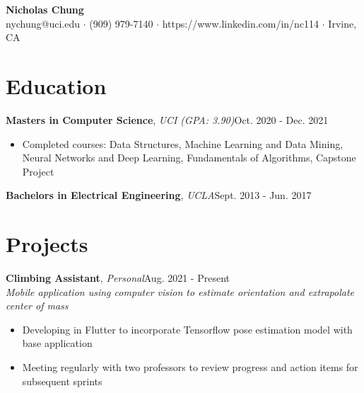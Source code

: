 \documentclass[12pt]{article}
\newcommand\firstboxx[2]{\textbf{\fontsize{12.8}{15}\selectfont #1}, \textit{#2}}
\newcommand{\itemheader}[3]{\firstboxx{#1}{#2}\hfill#3}
\begin{document}
\begin{center}
	\textbf{\LARGE Nicholas Chung} \\ \vspace{.5ex}
	nychung@uci.edu $\cdot$ (909) 979-7140 $\cdot$ https://www.linkedin.com/in/nc114 $\cdot$ Irvine, CA
\end{center}


\section*{Education}
\vspace*{-1em}\makebox[\linewidth]{\rule{\textwidth}{0.4pt}}
\itemheader{Masters in Computer Science}{UCI (GPA: 3.90)}{Oct. 2020 - Dec. 2021}
\begin{itemize}
\item Completed courses: Data Structures, Machine Learning and Data Mining, Neural Networks and Deep Learning, Fundamentals of Algorithms, Capstone Project
\end{itemize}

\smallskip
\itemheader{Bachelors in Electrical Engineering}{UCLA}{Sept. 2013 - Jun. 2017}


\section*{Projects}
\vspace*{-1em}\makebox[\linewidth]{\rule{\textwidth}{0.4pt}}

\itemheader{Climbing Assistant}{Personal}{Aug. 2021 - Present}
\\ \textit{Mobile application using computer vision to estimate orientation and extrapolate center of mass}
\begin{itemize}
\item Developing in Flutter to incorporate Tensorflow pose estimation model with base application
\item Meeting regularly with two professors to review progress and action items for subsequent sprints
\end{itemize}
\end{document}
